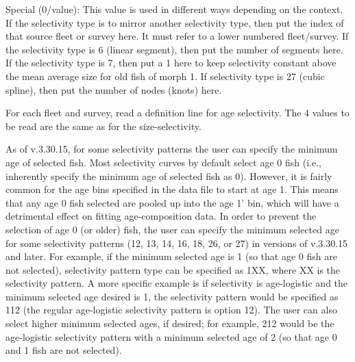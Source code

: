 Special (0/value): This value is used in different ways depending on the context. If the selectivity type is to mirror another selectivity type, then put the index of that source fleet or survey here. It must refer to a lower numbered fleet/survey. If the selectivity type is 6 (linear segment), then put the number of segments here. If the selectivity type is 7, then put a 1 here to keep selectivity constant above the mean average size for old fish of morph 1. If selectivity type is 27 (cubic spline), then put the number of nodes (knots) here.

For each fleet and survey, read a definition line for age selectivity. The 4 values to be read are the same as for the size-selectivity. 

As of v.3.30.15, for some selectivity patterns the user can specify the minimum age of selected fish. Most selectivity curves by default select age 0 fish (i.e., inherently specify the minimum age of selected fish as 0). However, it is fairly common for the age bins specified in the data file to start at age 1. This means that any age 0 fish selected are pooled up into the age 1' bin, which will have a detrimental effect on fitting age-composition data. In order to prevent the selection of age 0 (or older) fish, the user can specify the minimum selected age for some selectivity patterns (12, 13, 14, 16, 18, 26, or 27) in versions of v.3.30.15 and later. For example, if the minimum selected age is 1 (so that age 0 fish are not selected), selectivity pattern type can be specified as 1XX, where XX is the selectivity pattern. A more specific example is if selectivity is age-logistic and the minimum selected age desired is 1, the selectivity pattern would be specified as 112 (the regular age-logistic selectivity pattern is option 12). The user can also select higher minimum selected ages, if desired; for example, 212 would be the age-logistic selectivity pattern with a minimum selected age of 2 (so that age 0 and 1 fish are not selected).

\hypertarget{SelRetParam}{}
